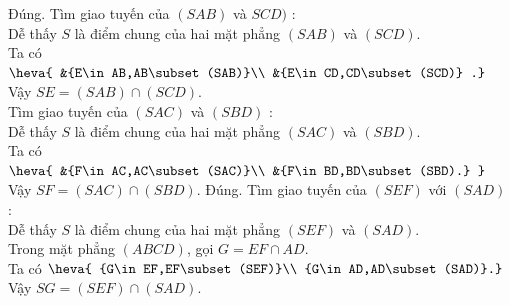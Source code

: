 \begin{ex}
{\begin{itemchoice}
\begin{center}
   \end{center}
   \itemch Đúng. Tìm giao tuyến của $ (SAB)$ và $ SCD)$  :\\
   Dễ thấy $ S$ là điểm chung của  hai mặt phẳng $ (SAB)$ và $ (SCD)$.\\
   Ta có  $\heva{
    &{E\in AB,AB\subset (SAB)}\\
   &{E\in CD,CD\subset  (SCD)}
   .}$\\ 
   Vậy $ SE=(SAB)\cap  (SCD)$.\\
   Tìm giao tuyến của $ (SAC)$ và $ (SBD)$  :\\
   Dễ thấy  $ S$ là điểm chung của hai mặt phẳng $ (SAC)$ và $ (SBD)$.\\
   Ta có  $\heva{
    &{F\in AC,AC\subset (SAC)}\\
   &{F\in BD,BD\subset  (SBD).}
    }$\\
    Vậy $ SF=(SAC)\cap (SBD)$.
   \itemch Đúng. Tìm giao tuyến của $ (SEF)$ với $ (SAD)$ :\\ 
   Dễ thấy $ S$ là điểm chung  của hai mặt phẳng $ (SEF)$ và $ (SAD)$.\\
   Trong mặt phẳng $ (ABCD)$, gọi $ G=EF\cap AD$.\\ 
   Ta có  $ \heva{
   {G\in EF,EF\subset (SEF)}\\ 
    {G\in AD,AD\subset (SAD)}.}$\\
   Vậy  $SG=(SEF)\cap (SAD)$.
  \end{itemchoice}
  }
\end{ex}

